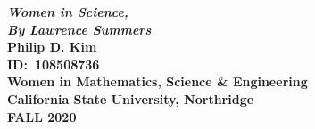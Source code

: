 \begin{titlepage}
  \begin{center}
  \vspace*{5cm}
  \Huge\textbf{\textsl{Women in Science,\\By Lawrence Summers}}\\
  \vspace*{10cm}
  \LARGE\textbf{Philip D. Kim}\\
  \large\textbf{ID:\ 108508736}\\
  \vspace*{0.5cm}
  \large\textbf{Women in Mathematics, Science \& Engineering}\\
  \large\textbf{California State University, Northridge}\\
  \vspace*{0.5cm}
  \large\textbf{FALL 2020}
  \end{center}
\end{titlepage}
